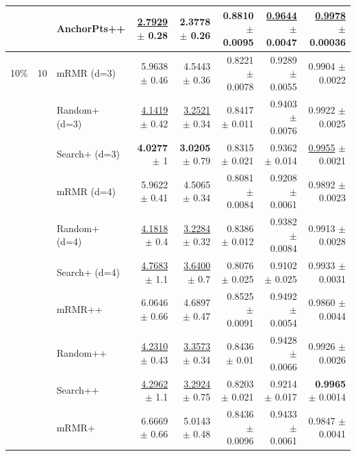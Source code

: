 \begin{longtable}{llp{}rrrrr}
 &  & AnchorPts++ & \underline{2.7929} {\scriptsize $\pm$ 0.28} & 2.3778 {\scriptsize $\pm$ 0.26} & 0.8810 {\scriptsize $\pm$ 0.0095} & \underline{0.9644} {\scriptsize $\pm$ 0.0047} & \underline{0.9978} {\scriptsize $\pm$ 0.00036} \\
\midrule
10\% & 10 & mRMR (d=3) & 5.9638 {\scriptsize $\pm$ 0.46} & 4.5443 {\scriptsize $\pm$ 0.36} & 0.8221 {\scriptsize $\pm$ 0.0078} & 0.9289 {\scriptsize $\pm$ 0.0055} & 0.9904 {\scriptsize $\pm$ 0.0022} \\
 &  & Random+ (d=3) & \underline{4.1419} {\scriptsize $\pm$ 0.42} & \underline{3.2521} {\scriptsize $\pm$ 0.34} & 0.8417 {\scriptsize $\pm$ 0.011} & 0.9403 {\scriptsize $\pm$ 0.0076} & 0.9922 {\scriptsize $\pm$ 0.0025} \\
 &  & Search+ (d=3) & \textbf{4.0277} {\scriptsize $\pm$ 1} & \textbf{3.0205} {\scriptsize $\pm$ 0.79} & 0.8315 {\scriptsize $\pm$ 0.021} & 0.9362 {\scriptsize $\pm$ 0.014} & \underline{0.9955} {\scriptsize $\pm$ 0.0021} \\
 &  & mRMR (d=4) & 5.9622 {\scriptsize $\pm$ 0.41} & 4.5065 {\scriptsize $\pm$ 0.34} & 0.8081 {\scriptsize $\pm$ 0.0084} & 0.9208 {\scriptsize $\pm$ 0.0061} & 0.9892 {\scriptsize $\pm$ 0.0023} \\
 &  & Random+ (d=4) & \underline{4.1818} {\scriptsize $\pm$ 0.4} & \underline{3.2284} {\scriptsize $\pm$ 0.32} & 0.8386 {\scriptsize $\pm$ 0.012} & 0.9382 {\scriptsize $\pm$ 0.0084} & 0.9913 {\scriptsize $\pm$ 0.0028} \\
 &  & Search+ (d=4) & \underline{4.7683} {\scriptsize $\pm$ 1.1} & \underline{3.6400} {\scriptsize $\pm$ 0.7} & 0.8076 {\scriptsize $\pm$ 0.025} & 0.9102 {\scriptsize $\pm$ 0.025} & 0.9933 {\scriptsize $\pm$ 0.0031} \\
 &  & mRMR++ & 6.0646 {\scriptsize $\pm$ 0.66} & 4.6897 {\scriptsize $\pm$ 0.47} & 0.8525 {\scriptsize $\pm$ 0.0091} & 0.9492 {\scriptsize $\pm$ 0.0054} & 0.9860 {\scriptsize $\pm$ 0.0044} \\
 &  & Random++ & \underline{4.2310} {\scriptsize $\pm$ 0.43} & \underline{3.3573} {\scriptsize $\pm$ 0.34} & 0.8436 {\scriptsize $\pm$ 0.01} & 0.9428 {\scriptsize $\pm$ 0.0066} & 0.9926 {\scriptsize $\pm$ 0.0026} \\
 &  & Search++ & \underline{4.2962} {\scriptsize $\pm$ 1.1} & \underline{3.2924} {\scriptsize $\pm$ 0.75} & 0.8203 {\scriptsize $\pm$ 0.021} & 0.9214 {\scriptsize $\pm$ 0.017} & \textbf{0.9965} {\scriptsize $\pm$ 0.0014} \\
 &  & mRMR+ & 6.6669 {\scriptsize $\pm$ 0.66} & 5.0143 {\scriptsize $\pm$ 0.48} & 0.8436 {\scriptsize $\pm$ 0.0096} & 0.9433 {\scriptsize $\pm$ 0.0061} & 0.9847 {\scriptsize $\pm$ 0.0041} \\

\end{longtable}

